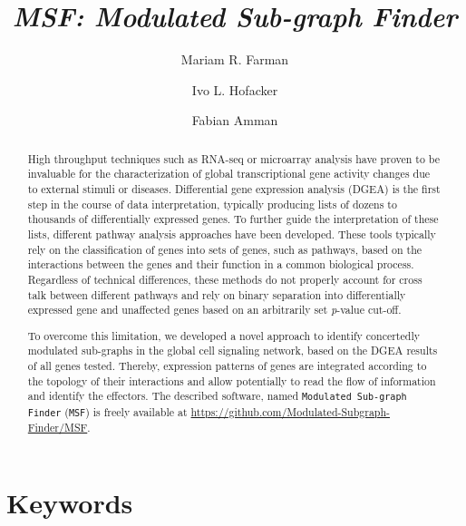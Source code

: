 \documentclass[10pt,a4paper,twocolumn]{article}
\begin{document}
\title{\textit{MSF: Modulated Sub-graph Finder} }

\author[1]{Mariam R. Farman}
\author[1]{Ivo L. Hofacker}
\author[1,2]{Fabian Amman}



\maketitle
\thispagestyle{fancy}

\begin{abstract}

High throughput techniques such as RNA-seq or microarray analysis have
proven to be invaluable for the characterization of global transcriptional
gene activity changes due to external stimuli or diseases. Differential
gene expression analysis (DGEA) is the first step in the course of data
interpretation, typically producing lists of dozens to thousands of
differentially expressed genes. To further guide the interpretation of
these lists, different pathway analysis approaches have been
developed. These tools typically rely on the classification of genes into
sets of genes, such as pathways, based on the interactions between the genes
and their function in a common biological process. Regardless of technical
differences, these methods do not properly account for cross talk between
different pathways and rely on binary separation into differentially
expressed gene and unaffected genes based on an arbitrarily set \textit{p}-value
cut-off.

To overcome this limitation, we developed a novel approach to identify
concertedly modulated sub-graphs in the global cell signaling network,
based on the DGEA results of all genes tested. Thereby, expression patterns
of genes are integrated according to the topology of their interactions and
allow potentially to read the flow of information and identify the effectors. The described software, named \texttt{Modulated
  Sub-graph Finder} (\texttt{MSF}) is freely available at
\url{https://github.com/Modulated-Subgraph-Finder/MSF}.

\end{abstract}

\section*{Keywords}
\end{document}
